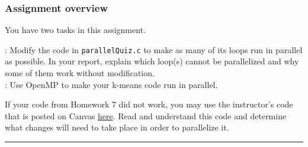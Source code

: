 \subsubsection*{Assignment overview}
\noindent You have two tasks in this assignment.

\vspace{8pt}: Modify the code in \texttt{parallelQuiz.c} to make as many of its loops run in parallel as possible. In your report, explain which loop(s) cannot be parallelized and why some of them work without modification.
\\
\vspace{4pt}: Use OpenMP to make your k-means code run in parallel.
\begin{tcolorbox}[width=\textwidth,colback=green]
If your code from Homework 7 did not work, you may use the instructor's code that is posted on Canvas \href{https://canvas.vt.edu/courses/95914/files/folder/Homework/HW07\%20example}{here}.
Read and understand this code and determine what changes will need to take place in order to parallelize it.
\end{tcolorbox}
\vspace{8pt}\hrule 


